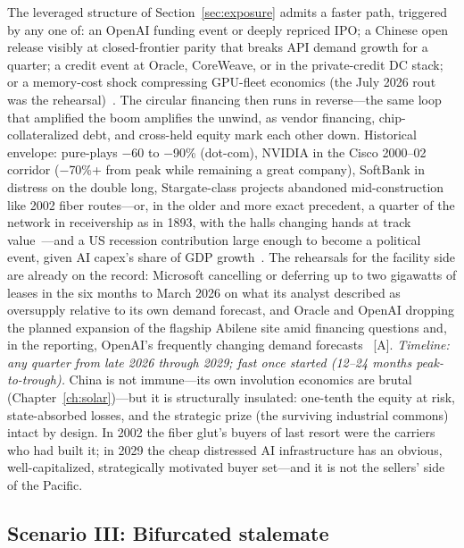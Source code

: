 The leveraged structure of Section~\ref{sec:exposure} admits a faster path, triggered by any one of: an OpenAI funding event or deeply repriced IPO; a Chinese open release visibly at closed-frontier parity that breaks API demand growth for a quarter; a credit event at Oracle, CoreWeave, or in the private-credit DC stack; or a memory-cost shock compressing GPU-fleet economics (the July 2026 rout was the rehearsal)~\cite{memory-rout,oracle-cds}. The circular financing then runs in reverse---the same loop that amplified the boom amplifies the unwind, as vendor financing, chip-collateralized debt, and cross-held equity mark each other down. Historical envelope: pure-plays $-$60 to $-$90\% (dot-com), NVIDIA in the Cisco 2000--02 corridor ($-$70\%+ from peak while remaining a great company), SoftBank in distress on the double long, Stargate-class projects abandoned mid-construction like 2002 fiber routes---or, in the older and more exact precedent, a quarter of the network in receivership as in 1893, with the halls changing hands at track value~\cite{rail-1893}---and a US recession contribution large enough to become a political event, given AI capex's share of GDP growth~\cite{gdp-ai}. The rehearsals for the facility side are already on the record: Microsoft cancelling or deferring up to two gigawatts of leases in the six months to March 2026 on what its analyst described as oversupply relative to its own demand forecast, and Oracle and OpenAI dropping the planned expansion of the flagship Abilene site amid financing questions and, in the reporting, OpenAI's frequently changing demand forecasts~\cite{dc-cancellations} [A]. \emph{Timeline: any quarter from late 2026 through 2029; fast once started (12--24 months peak-to-trough).} China is not immune---its own involution economics are brutal (Chapter~\ref{ch:solar})---but it is structurally insulated: one-tenth the equity at risk, state-absorbed losses, and the strategic prize (the surviving industrial commons) intact by design. In 2002 the fiber glut's buyers of last resort were the carriers who had built it; in 2029 the cheap distressed AI infrastructure has an obvious, well-capitalized, strategically motivated buyer set---and it is not the sellers' side of the Pacific.

\subsection{Scenario III: Bifurcated stalemate}

